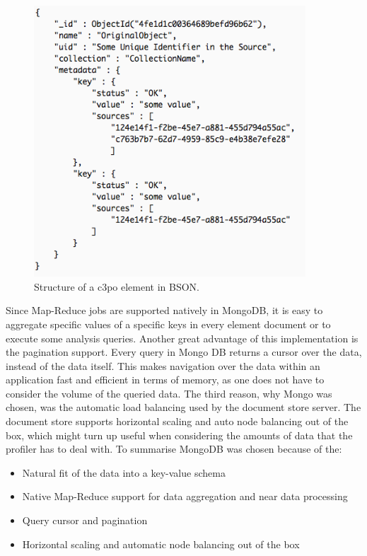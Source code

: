 \begin{figure}[h]
\begin{center}
\includegraphics[width=4in]{figures/architecture/document_structure.png}
\caption{Structure of a c3po element in BSON.}
\label{fig:document_structure}
\end{center}
\end{figure}

Since Map-Reduce jobs are supported natively in MongoDB, it is easy to aggregate specific values of a specific keys in every element document or to execute some analysis queries. Another great advantage of this implementation is the pagination support. Every query in Mongo DB returns a cursor over the data, instead of the data itself. This makes navigation over the data within an application fast and efficient in terms of memory, as one does not have to consider the volume of the queried data.
The third reason, why Mongo was chosen, was the automatic load balancing used by the document store server. The document store supports horizontal scaling and auto node balancing out of the box, which might turn up useful when considering the amounts of data that the profiler has to deal with. To summarise MongoDB was chosen because of the:

\begin{itemize}
\item Natural fit of the data into a key-value schema
\item Native Map-Reduce support for data aggregation and near data processing
\item Query cursor and pagination
\item Horizontal scaling and automatic node balancing out of the box
\end{itemize}


